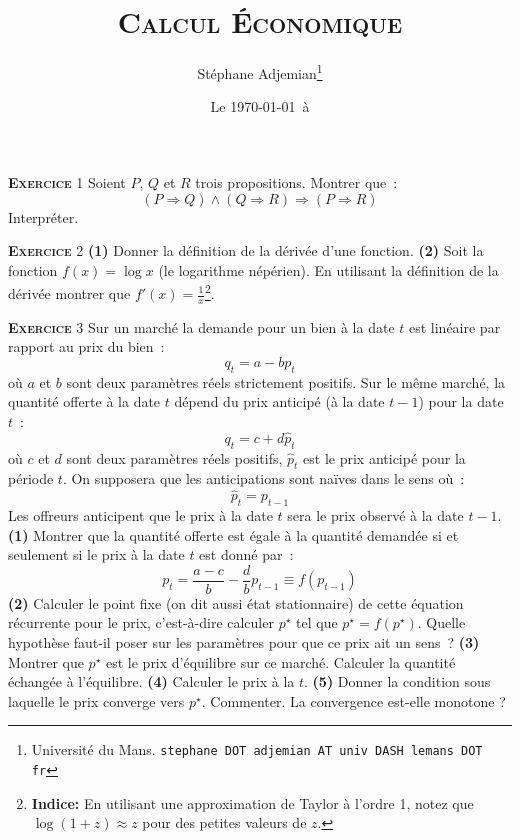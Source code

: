 \documentclass[10pt,a4paper,notitlepage]{article}
\newcommand{\exercice}[1]{\textsc{\textbf{Exercice}} #1}
\begin{document}
\title{\textsc{Calcul Économique}}
\author{Stéphane Adjemian\thanks{Université du Mans. \texttt{stephane DOT adjemian AT univ DASH lemans DOT fr}}}
\date{Le \today\ à \thistime}

\maketitle

\exercice{1} Soient $P$, $Q$ et $R$ trois propositions. Montrer que :
	\[
		(P \Rightarrow Q) \land (Q \Rightarrow R) \Rightarrow (P \Rightarrow R)
	\]
	Interpréter.
	
\bigskip

\exercice{2} \textbf{(1)} Donner la définition de la dérivée d'une
fonction. \textbf{(2)} Soit la fonction $f(x) = \log x$ (le logarithme népérien). En utilisant la définition de la dérivée montrer que $f'(x)=\frac{1}{x}$\footnote{\textbf{Indice:} En utilisant une approximation de Taylor à l'ordre 1, notez que $\log (1+z) \approx z$ pour des petites valeurs de $z$.}.

\bigskip

\exercice{3} Sur un marché la demande pour un bien à la date $t$ est linéaire par
rapport au prix du bien :
\[
q_t = a - b p_t
\]
où $a$ et $b$ sont deux paramètres réels strictement positifs. Sur le même marché,
la quantité offerte à la date $t$ dépend du prix anticipé (à la date
$t-1$) pour la date $t$ :
\[
q_t = c + d \hat p_t
\]
où $c$ et $d$ sont deux paramètres réels positifs, $\hat p_t$ est le
prix anticipé pour la période $t$. On supposera que les anticipations
sont naïves dans le sens où :
\[
\hat p_t = p_{t-1}
\]
Les offreurs anticipent que le prix à la date $t$ sera le prix observé
à la date $t-1$. \textbf{(1)} Montrer que la quantité offerte est
égale à la quantité demandée si et seulement si le prix à la date $t$
est donné par :
\[
p_t = \frac{a-c}{b} - \frac{d}{b} p_{t-1} \equiv f(p_{t-1})
\]
\textbf{(2)} Calculer le point fixe (on dit aussi état stationnaire)
de cette équation récurrente pour le prix, c'est-à-dire calculer
$p^{\star}$ tel que $p^{\star} = f(p^{\star})$. Quelle hypothèse
faut-il poser sur les paramètres pour que ce prix ait un sens ? \textbf{(3)}
Montrer que $p^{\star}$ est le prix d'équilibre sur ce
marché. Calculer la quantité échangée à l'équilibre. \textbf{(4)}
Calculer le prix à la $t$. \textbf{(5)} Donner la condition sous
laquelle le prix converge vers $p^{\star}$. Commenter. La convergence
est-elle monotone ?

\bigskip
\end{document}
